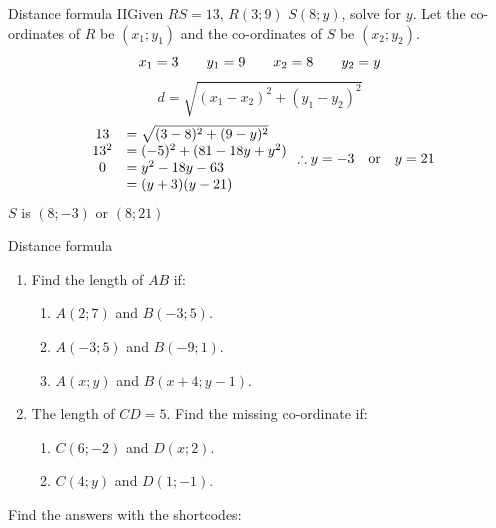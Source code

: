 \begin{wex}{Distance formula II}{Given $RS = 13$, $R(3;9)$ $S(8;y)$, solve for $y$.}{
Let the co-ordinates of $R$ be $(x_1;y_1)$ and the co-ordinates of $S$ be $(x_2;y_2)$.
\begin{equation*}
 x_1 = 3 \hskip2em y_1 = 9 \hskip2em x_2 = 8 \hskip2em y_2 = y
\end{equation*}
\begin{equation*}
 d = \sqrt{(x_1 - x_2)^2 + (y_1 - y_2)^2}
\end{equation*}
\begin{equation*}
 \begin{array}{cl}
  13 &= \sqrt{(3 - 8)^2 + (9 - y)^2}\\
  13^2 & = (-5)^2 + (81 - 18y + y^2)\\
  0 &= y^2 - 18y - 63\\
  &= (y+3) (y-21)\\
 \end{array}
 \therefore y = -3 \hskip1em \mathrm{or} \hskip1em y = 21
\end{equation*}
$S$ is $(8;-3)$ or $(8;21)$
\vspace{2pt}
    \vspace{.1in}
}
\end{wex}
\begin{exercises}{Distance formula}{
 \begin{enumerate}[label=\textbf{\arabic*}.]
  \item Find the length of $AB$ if:
  \begin{enumerate}
   \item $A(2;7)$ and $B(-3;5)$.
   \item $A(-3;5)$ and $B(-9;1)$.
   \item $A(x;y)$ and $B(x+4;y-1)$.
  \end{enumerate}
  
  \item The length of $CD=5$. Find the missing co-ordinate if:
  \begin{enumerate}
   \item $C(6;-2)$ and $D(x;2)$.
   \item $C(4;y)$ and $D(1;-1)$.
  \end{enumerate}
 \end{enumerate}

 Find the answers with the shortcodes:}
\end{exercises}

